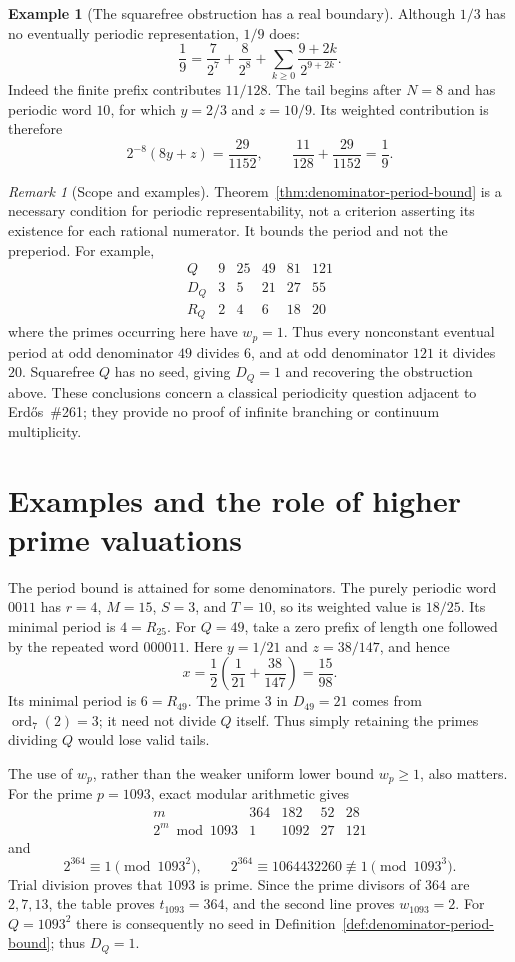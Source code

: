 \documentclass[11pt]{article}
\theoremstyle{definition}
\newtheorem{example}[theorem]{Example}
\theoremstyle{remark}
\newtheorem{remark}[theorem]{Remark}
\DeclareMathOperator{\ord}{ord}
\begin{document}
\begin{example}[The squarefree obstruction has a real boundary]
Although $1/3$ has no eventually periodic representation, $1/9$ does:
\[
 \frac19=\frac7{2^7}+\frac8{2^8}
          +\sum_{k\ge0}\frac{9+2k}{2^{9+2k}}.
\]
Indeed the finite prefix contributes $11/128$. The tail begins after $N=8$ and has periodic word $10$, for which $y=2/3$ and $z=10/9$. Its weighted contribution is therefore
\[
 2^{-8}(8y+z)=\frac{29}{1152},\qquad
 \frac{11}{128}+\frac{29}{1152}=\frac19.
\]
\end{example}

\begin{remark}[Scope and examples]
Theorem~\ref{thm:denominator-period-bound} is a necessary condition for periodic representability, not a criterion asserting its existence for each rational numerator. It bounds the period and not the preperiod. For example,
\[
\begin{array}{c|ccccc}
 Q&9&25&49&81&121\\\hline
 D_Q&3&5&21&27&55\\
 R_Q&2&4&6&18&20
\end{array}
\]
where the primes occurring here have $w_p=1$. Thus every nonconstant eventual period at odd denominator $49$ divides $6$, and at odd denominator $121$ it divides $20$. Squarefree $Q$ has no seed, giving $D_Q=1$ and recovering the obstruction above. These conclusions concern a classical periodicity question adjacent to Erd\H{o}s~\#261; they provide no proof of infinite branching or continuum multiplicity.
\end{remark}

\section{Examples and the role of higher prime valuations}
The period bound is attained for some denominators. The purely periodic
word $0011$ has $r=4$, $M=15$, $S=3$, and $T=10$, so its weighted
value is $18/25$. Its minimal period is $4=R_{25}$. For $Q=49$, take
a zero prefix of length one followed by the repeated word $000011$.
Here $y=1/21$ and $z=38/147$, and hence
\[
 x=\frac12\left(\frac1{21}+\frac{38}{147}\right)=\frac{15}{98}.
\]
Its minimal period is $6=R_{49}$. The prime $3$ in $D_{49}=21$ comes
from $\ord_7(2)=3$; it need not divide $Q$ itself. Thus simply retaining
the primes dividing $Q$ would lose valid tails.

The use of $w_p$, rather than the weaker uniform lower bound $w_p\ge1$,
also matters. For the prime $p=1093$, exact modular arithmetic gives
\[
\begin{array}{c|rrrr}
 m&364&182&52&28\\\hline
 2^m\bmod1093&1&1092&27&121
\end{array}
\]
and
\[
 2^{364}\equiv1\pmod{1093^2},\qquad
 2^{364}\equiv1064432260\not\equiv1\pmod{1093^3}.
\]
Trial division proves that $1093$ is prime. Since the prime divisors of
$364$ are $2,7,13$, the table proves $t_{1093}=364$, and the second
line proves $w_{1093}=2$. For $Q=1093^2$ there is consequently no seed
in Definition~\ref{def:denominator-period-bound}; thus $D_Q=1$.
\end{document}
